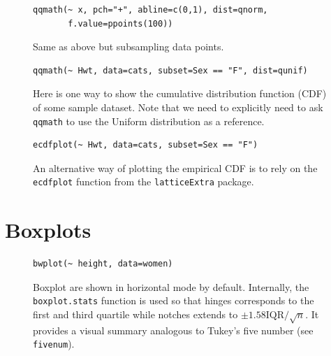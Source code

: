 \documentclass[a4paper,twoside]{book}
\newcounter{fig}
\newcommand{\img}[1]{\texttt{[image: \#1]}\stepcounter{fig}}
\renewcommand{\texttt}[1]{\lstinline{#1}}
\begin{document}
\begin{figure}[H]
\begin{lstlisting}
qqmath(~ x, pch="+", abline=c(0,1), dist=qnorm, 
       f.value=ppoints(100))
\end{lstlisting}
  \fcapside[\FBwidth] {\img{figs_lattice-crop}}
  {\caption*{Same as above but subsampling data points.}}
\end{figure}

\begin{figure}[H]
\begin{lstlisting}
qqmath(~ Hwt, data=cats, subset=Sex == "F", dist=qunif)
\end{lstlisting}
  \fcapside[\FBwidth] {\img{figs_lattice-crop}}
  {\caption*{
      Here is one way to show the cumulative distribution function
      (CDF) of some sample dataset. Note that we need to explicitly
      need to ask \texttt{qqmath} to use the Uniform distribution as a
      reference.}}
\end{figure}

\begin{figure}[H]
\begin{lstlisting}
ecdfplot(~ Hwt, data=cats, subset=Sex == "F")
\end{lstlisting}
  \fcapside[\FBwidth] {\img{figs_lattice-crop}}
  {\caption*{An alternative way of plotting the empirical CDF is to
      rely on the \texttt{ecdfplot} function from the
      \texttt{latticeExtra} package.}}
\end{figure}


\section{Boxplots}\label{sec:boxplot}
\lipsum[1]

\begin{figure}[H]
\begin{lstlisting}
bwplot(~ height, data=women)
\end{lstlisting}
  \fcapside[\FBwidth] {\img{figs_lattice-crop}}
  {\caption*{
      Boxplot are shown in horizontal mode by default. Internally, the
      \texttt{boxplot.stats} function is used so that hinges
      corresponds to the first and third quartile while notches
      extends to $\pm 1.58\textrm{IQR}/\sqrt{n}$. It provides a visual
      summary analogous to Tukey's five number (see
      \texttt{fivenum}).}}
\end{figure}
\end{document}
